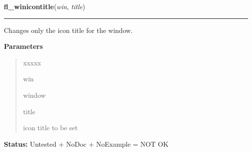 \hspace{.8\funcindent}\begin{boxedminipage}{\funcwidth}

    \raggedright \textbf{fl\_winicontitle}(\textit{win}, \textit{title})

    \vspace{-1.5ex}

    \rule{\textwidth}{0.5\fboxrule}
\setlength{\parskip}{2ex}
    Changes only the icon title for the window.

\setlength{\parskip}{1ex}
      \textbf{Parameters}
      \vspace{-1ex}

      \begin{quote}
        \begin{Ventry}{xxxxx}

          \item[win]

          window

          \item[title]

          icon title to be set

        \end{Ventry}

      \end{quote}

\textbf{Status:} Untested + NoDoc + NoExample = NOT OK



    \end{boxedminipage}

    \label{xformslib:library:fl_winposition}

    \vspace{0.5ex}

